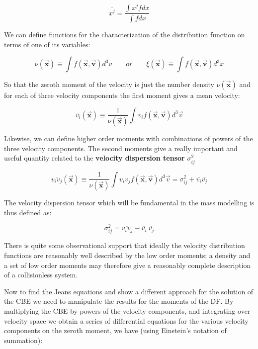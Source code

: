\begin{equation}
\overline{x^{j}}=\frac {\int x^{j}fdx}{\int fdx}
\end{equation}

We can define functions for the characterization of the distribution function on terms of one of its variables:

\begin{equation}
\nu(\vec{\textbf{x}})\equiv \int f(\vec{\textbf{x}},\vec{\textbf{v}})d^{3}v\quad\quad or \quad\quad  \xi(\vec{\textbf{x}})\equiv \int f(\vec{\textbf{x}},\vec{\textbf{v}})d^{3}x
\end{equation}

So that the zeroth moment of the velocity is just the number density $\nu(\vec{\textbf{x}})$ and for each of three velocity components the first moment gives a mean velocity:

\begin{equation}
\bar{v_{i}}(\vec{\textbf{x}})\equiv \frac{1}{\nu(\vec{\textbf{x}})}\int v_{i}f(\vec{\textbf{x}},\vec{\textbf{v}})d^{3}\vec{v}
\end{equation}

Likewise, we can define higher order moments with combinations of powers of the three velocity components. The second moments give a really important and useful quantity related to the \textbf{velocity dispersion tensor} $\sigma^{2}_{ij}$

\begin{equation}
\overline{v_{i}v_{j}}(\vec{\textbf{x}})\equiv \frac{1}{\nu(\vec{\textbf{x}})}\int v_{i}v_{j}f(\vec{\textbf{x}},\vec{\textbf{v}})d^{3}\vec{v}=\sigma^{2}
_{ij}+\bar{v_{i}}\bar{v_{j}}
\end{equation}

The velocity dispersion tensor which will be fundamental in the mass modelling is thus defined as:

\begin{equation}
\sigma_{ij}^{2}=\overline{v_{i}v_{j}}-\overline{v_{i}}\:\overline{v_{j}}
\end{equation}

There is quite some observational support that ideally the velocity distribution functions are reasonably well described by the low order moments; a density and a set of low order moments may therefore give a reasonably complete description of a collisionless system. 

Now to find the Jeans equations and show a different approach for the solution of the CBE we need to manipulate the results for the moments of the DF. By multiplying the CBE by powers of the velocity components, and integrating over velocity space we obtain a series of differential equations for the various velocity components on the zeroth moment, we have (using Einstein's notation of summation):

